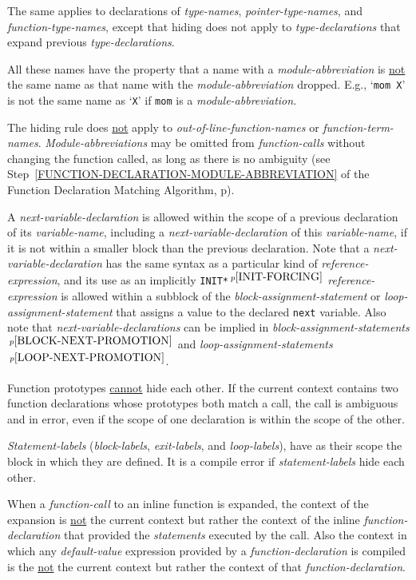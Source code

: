 \documentclass[12pt]{article}
\newcommand{\pagref}[1]{p\pageref{#1}}
\newcommand{\pagnote}[1]{$\,^{p\pageref{#1}}$}
\begin{document}
The same applies to declarations of {\em type-names},
{\em pointer-type-names}, and {\em function-type-names},
except that hiding does not
apply to {\em type-declarations} that expand previous
{\em type-declarations}.

All these names have the property that a name with a {\em module-abbreviation}
is \underline{not} the same name as that name with the {\em module-abbreviation}
dropped.  E.g., `{\tt mom X}' is not the same name as `{\tt X}' if
{\tt mom} is a {\em module-abbreviation}.

The hiding rule does \underline{not}
apply to {\em out-of-line-function-names} or {\em function-term-names}.
{\em Mod\-ule-abbreviations} may be omitted from {\em function-calls}
without changing the function called, as long as there is no
ambiguity (see Step~\ref{FUNCTION-DECLARATION-MODULE-ABBREVIATION}
of the Function Declaration Matching Algorithm,
\pagref{FUNCTION-DECLARATION-MODULE-ABBREVIATION}).

A {\em next-variable-declaration} is allowed
within the scope of a previous declaration of its {\em variable-name},
including a {\em next-variable-declaration} of this {\em variable-name},
if it is not within a smaller block than the previous declaration.
Note that a {\em next-variable-declaration} has
the same syntax as a particular kind of {\em reference-expression}, and its use
as an implicitly {\tt *INIT*}\pagnote{INIT-FORCING} {\em reference-expression}
is allowed within a subblock of the {\em block-assignment-state\-ment}
or {\em loop-assignment-statement} that assigns a value to the
declared {\tt next} variable.
Also note that {\em next-variable-declarations} can be implied
in {\em block-assignment-statements}\pagnote{BLOCK-NEXT-PROMOTION}
and {\em loop-assignment-statements}\pagnote{LOOP-NEXT-PROMOTION}.

Function prototypes \underline{cannot} hide each other.  If the
current context contains two function declarations whose prototypes
both match a call, the call is ambiguous and in error,
even if the scope of one declaration is within
the scope of the other.

{\em Statement-labels} ({\em block-labels},
{\em exit-labels}, and {\em loop-labels}), have as their scope
the block in which they are defined.  It is a compile
error if {\em statement-labels} hide each other.

When a {\em function-call} to an inline function is expanded,
the context of the expansion is \underline{not} the current context but
rather the context of the inline {\em function-declaration}
that provided the {\em statements} executed by the call.
Also the context in which any {\em default-value} expression
provided by a {\em function-declaration} is compiled\label{DEFAULT-CONTEXT}
is the \underline{not} the current context but
rather the context of that {\em function-declaration}.
\end{document}
